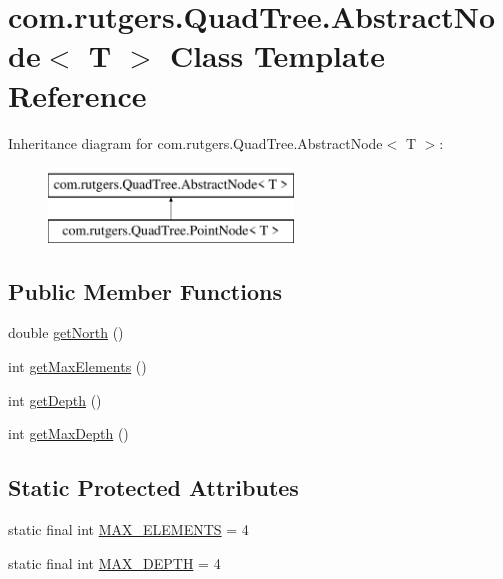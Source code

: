 \hypertarget{classcom_1_1rutgers_1_1QuadTree_1_1AbstractNode}{}\section{com.\+rutgers.\+Quad\+Tree.\+Abstract\+Node$<$ T $>$ Class Template Reference}
\label{classcom_1_1rutgers_1_1QuadTree_1_1AbstractNode}
Inheritance diagram for com.\+rutgers.\+Quad\+Tree.\+Abstract\+Node$<$ T $>$\+:\begin{figure}[H]
\begin{center}
\leavevmode
\includegraphics[height=2.000000cm]{classcom_1_1rutgers_1_1QuadTree_1_1AbstractNode}
\end{center}
\end{figure}
\subsection*{Public Member Functions}
\begin{DoxyCompactItemize}
\item 
double \hyperlink{classcom_1_1rutgers_1_1QuadTree_1_1AbstractNode_a0008c92d400cabb75304a86f79ef5ae4}{get\+North} ()
\item 
int \hyperlink{classcom_1_1rutgers_1_1QuadTree_1_1AbstractNode_af9a2b6025ac383b8ca8fd480519cde8a}{get\+Max\+Elements} ()
\item 
int \hyperlink{classcom_1_1rutgers_1_1QuadTree_1_1AbstractNode_ac3c4018f5d4369e09c58302bb9fa6012}{get\+Depth} ()
\item 
int \hyperlink{classcom_1_1rutgers_1_1QuadTree_1_1AbstractNode_a914674ce25b34e9818256028eabedf12}{get\+Max\+Depth} ()
\end{DoxyCompactItemize}
\subsection*{Static Protected Attributes}
\begin{DoxyCompactItemize}
\item 
static final int \hyperlink{classcom_1_1rutgers_1_1QuadTree_1_1AbstractNode_a3d1b2ce46d601ea32690b5d5e1706fd5}{M\+A\+X\+\_\+\+E\+L\+E\+M\+E\+N\+TS} = 4
\item 
static final int \hyperlink{classcom_1_1rutgers_1_1QuadTree_1_1AbstractNode_a72676d8499f815d16f4b8c72f3ac35c5}{M\+A\+X\+\_\+\+D\+E\+P\+TH} = 4
\end{DoxyCompactItemize}


